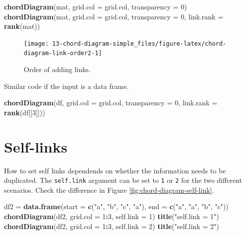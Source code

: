 \documentclass[]{book}
\newenvironment{Shaded}{\begin{snugshade}}{\end{snugshade}}
\newcommand{\KeywordTok}[1]{\textcolor[rgb]{0.13,0.29,0.53}{\textbf{#1}}}
\newcommand{\DataTypeTok}[1]{\textcolor[rgb]{0.13,0.29,0.53}{#1}}
\newcommand{\DecValTok}[1]{\textcolor[rgb]{0.00,0.00,0.81}{#1}}
\newcommand{\StringTok}[1]{\textcolor[rgb]{0.31,0.60,0.02}{#1}}
\newcommand{\OperatorTok}[1]{\textcolor[rgb]{0.81,0.36,0.00}{\textbf{#1}}}
\newcommand{\NormalTok}[1]{#1}
\begin{document}
\begin{Shaded}
\begin{Highlighting}[]
\KeywordTok{chordDiagram}\NormalTok{(mat, }\DataTypeTok{grid.col =}\NormalTok{ grid.col, }\DataTypeTok{transparency =} \DecValTok{0}\NormalTok{)}
\KeywordTok{chordDiagram}\NormalTok{(mat, }\DataTypeTok{grid.col =}\NormalTok{ grid.col, }\DataTypeTok{transparency =} \DecValTok{0}\NormalTok{, }\DataTypeTok{link.rank =} \KeywordTok{rank}\NormalTok{(mat))}
\end{Highlighting}
\end{Shaded}

\begin{figure}

{\centering \texttt{[image: 13-chord-diagram-simple\_files/figure-latex/chord-diagram-link-order2-1]} 

}

\caption{Order of adding links.}\label{fig:chord-diagram-link-order2}
\end{figure}

Similar code if the input is a data frame.

\begin{Shaded}
\begin{Highlighting}[]
\KeywordTok{chordDiagram}\NormalTok{(df, }\DataTypeTok{grid.col =}\NormalTok{ grid.col, }\DataTypeTok{transparency =} \DecValTok{0}\NormalTok{, }\DataTypeTok{link.rank =} \KeywordTok{rank}\NormalTok{(df[[}\DecValTok{3}\NormalTok{]]))}
\end{Highlighting}
\end{Shaded}

\section{Self-links}\label{self-links}

How to set self links dependends on whether the information needs to be
duplicated. The \texttt{self.link} argument can be set to \texttt{1} or
\texttt{2} for the two different scenarios. Check the difference in
Figure \ref{fig:chord-diagram-self-link}.

\begin{Shaded}
\begin{Highlighting}[]
\NormalTok{df2 =}\StringTok{ }\KeywordTok{data.frame}\NormalTok{(}\DataTypeTok{start =} \KeywordTok{c}\NormalTok{(}\StringTok{"a"}\NormalTok{, }\StringTok{"b"}\NormalTok{, }\StringTok{"c"}\NormalTok{, }\StringTok{"a"}\NormalTok{), }\DataTypeTok{end =} \KeywordTok{c}\NormalTok{(}\StringTok{"a"}\NormalTok{, }\StringTok{"a"}\NormalTok{, }\StringTok{"b"}\NormalTok{, }\StringTok{"c"}\NormalTok{))}
\KeywordTok{chordDiagram}\NormalTok{(df2, }\DataTypeTok{grid.col =} \DecValTok{1}\OperatorTok{:}\DecValTok{3}\NormalTok{, }\DataTypeTok{self.link =} \DecValTok{1}\NormalTok{)}
\KeywordTok{title}\NormalTok{(}\StringTok{"self.link = 1"}\NormalTok{)}
\KeywordTok{chordDiagram}\NormalTok{(df2, }\DataTypeTok{grid.col =} \DecValTok{1}\OperatorTok{:}\DecValTok{3}\NormalTok{, }\DataTypeTok{self.link =} \DecValTok{2}\NormalTok{)}
\KeywordTok{title}\NormalTok{(}\StringTok{"self.link = 2"}\NormalTok{)}
\end{Highlighting}
\end{Shaded}
\end{document}
